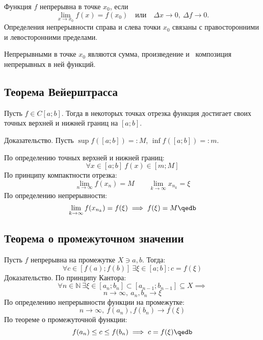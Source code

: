 Функция $f$ {\ital непрерывна} в точке $x_0$, если
$$\lim_{x\to x_0}f(x)=f(x_0)\quad\text{или}\quad\Delta x\to 0,\ \Delta f\to 0.$$
Определения {\ital непрерывности справа} и {\ital слева} точки $x_0$ связаны
с правосторонними и левосторонними пределами.

Непрерывными в точке $x_0$ являются {\ital сумма}, {\ital произведение} и~{\ital 
композиция} непрерывных в ней функций.

\newpage
\subsection{Теорема Вейерштрасса}

Пусть $f\in C[a;b]$. Тогда в некоторых точках отрезка функция достигает своих точных 
верхней и нижней границ на $[a;b]$.

{\bold Доказательство.} Пусть $\sup f([a;b])=:M$, $\inf f([a;b])=:m$.

По определению точных верхней и нижней границ:
$$\forall x\in[a;b]\ f(x)\in[m;M]$$
По принципу компактности отрезка:
$$\lim_{n\to\infty}f(x_n)=M\quad\quad\lim_{k\to\infty}x_{n_k}=\xi$$
По определению непрерывности:
$$\lim_{k\to\infty}f(x_{n_k})=f(\xi)\implies f(\xi)=M\qedb$$

\subsection{Теорема о промежуточном значении}

Пусть $f$ непрерывна на промежутке $X\ni a,b$. Тогда:
$$\forall c\in[f(a);f(b)]\ \exists\xi\in[a;b]\colon c=f(\xi)$$
{\bold Доказательство.} По принципу Кантора:
$$\forall n\in\mathbb{N}\ \exists\xi\in[a_n;b_n]\subset[a_{n-1};b_{n-1}]\subseteq X
\implies$$
$$n\to\infty,\ a_n,b_n\to\xi$$
По определению непрерывности функции на промежутке:
$$n\to\infty,\ f(a_n),f(b_n)\to f(\xi)$$
По теореме о промежуточной функции:
$$f(a_n)\leq c\leq f(b_n)\implies c=f(\xi)\qedb$$
